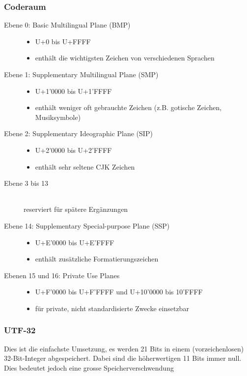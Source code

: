 \documentclass[a4paper,10pt]{article}
\begin{document}
\subsubsection{Coderaum}
\begin{description}
	\item[Ebene 0: Basic Multilingual Plane (BMP)] \hfill
		\begin{itemize}
			\item U+0 bis U+FFFF
			\item enth\"alt die wichtigsten Zeichen von verschiedenen Sprachen
		\end{itemize}
	\item[Ebene 1: Supplementary Multilingual Plane (SMP)] \hfill
		\begin{itemize}
			\item U+1'0000 bis U+1'FFFF
			\item enth\"alt weniger oft gebrauchte Zeichen (z.B. gotische Zeichen, Musiksymbole)
		\end{itemize}
	\item[Ebene 2: Supplementary Ideographic Plane (SIP)] \hfill
		\begin{itemize}
			\item U+2'0000 bis U+2'FFFF
			\item enth\"alt sehr seltene CJK Zeichen
		\end{itemize}
	\item[Ebene 3 bis 13] \hfill \\
		reserviert f\"ur sp\"atere Erg\"anzungen
	\item[Ebene 14: Supplementary Special-purpose Plane (SSP)] \hfill
		\begin{itemize}
			\item U+E'0000 bis U+E'FFFF
			\item enth\"alt zus\"atzliche Formatierungszeichen
		\end{itemize}
	\item[Ebenen 15 und 16: Private Use Planes] \hfill
		\begin{itemize}
			\item U+F'0000 bis U+F'FFFF und U+10'0000 bis 10'FFFF
			\item f\"ur private, nicht standardisierte Zwecke einsetzbar
		\end{itemize}
\end{description}

\subsubsection{UTF-32}
Dies ist die einfachste Umsetzung, es werden 21 Bits in einem (vorzeichenlosen) 32-Bit-Integer abgespeichert. Dabei sind die h\"oherwertigen 11 Bits immer null. Dies bedeutet jedoch eine grosse Speicherverschwendung
\end{document}
